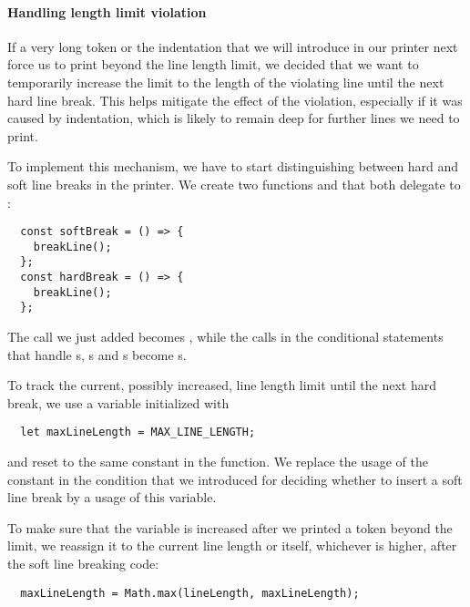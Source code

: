 \paragraph{Handling length limit violation}
If a very long token or the indentation
that we will introduce in our printer next
force us to print beyond the line length limit,
we decided that we want to temporarily increase
the limit to the length of the violating line
until the next hard line break.
This helps mitigate the effect of the violation,
especially if it was caused by indentation,
which is likely to remain deep
for further lines we need to print.

To implement this mechanism,
we have to start distinguishing between
hard and soft line breaks in the printer.
We create two functions
 and 
that both delegate to :
\begin{verbatim}
  const softBreak = () => {
    breakLine();
  };
  const hardBreak = () => {
    breakLine();
  };
\end{verbatim}
The  call we just added
becomes , while
the calls in the conditional statements
that handle s, s
and s become s.

To track the current, possibly increased, line length limit
until the next hard break, we use a variable initialized with
\begin{verbatim}
  let maxLineLength = MAX_LINE_LENGTH;
\end{verbatim}
and reset to the same constant in the  function.
We replace the usage of the constant in the condition
that we introduced for deciding whether to insert a soft line break
by a usage of this variable.

To make sure that the variable is increased
after we printed a token beyond the limit,
we reassign it to the current line length or itself,
whichever is higher, after the soft line breaking code:
\begin{verbatim}
  maxLineLength = Math.max(lineLength, maxLineLength);
\end{verbatim}

